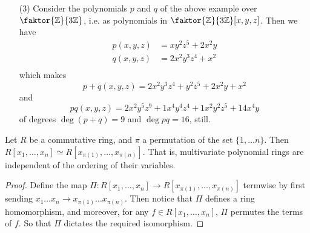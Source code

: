 \begin{example}
\begin{enumerate}
    \item[(3)] Consider the polynomials $p$ and $q$ of the above example
      over  $\faktor{\Z}{3\Z}$, i.e. as polynomials in
      $\faktor{\Z}{3\Z}[x,y,z]$. Then we have
      \begin{align*}
        p(x,y,z)    &=  xy^2z^5+2x^2y    \\
        q(x,y,z)    &=  2x^2y^3z^4+x^2  \\
      \end{align*}
      which makes
      \begin{equation*}
        p+q(x,y,z)=2x^2y^3z^4+y^2z^5+2x^2y+x^2
      \end{equation*}
      and
      \begin{equation*}
        pq(x,y,z)=2x^2y^5z^9+1x^4y^4z^4+1x^2y^2z^5+14x^4y
      \end{equation*}
      of degrees $\deg{(p+q)}=9$ and $\deg{pq}=16$, still.
  \end{enumerate}
\end{example}

\begin{lemma}\label{lemma_7.1.3}
  Let $R$ be a commutative ring, and  $\pi$ a permutation of the set  $\{1,
  \dots n\}$. Then $R[x_1, \dots, x_n] \simeq R[x_{\pi(1)}, \dots,
  x_{\pi(n)}]$. That is, multivariate polynomial rings are independent of the
  ordering of their variables.
\end{lemma}
\begin{proof}
  Define the map $\Pi:R[x_1, \dots, x_n] \xrightarrow{} R[x_{\pi(1)}, \dots,
  x_{\pi(n)}]$ termwise by first sending $x_1 \dots x_n \xrightarrow{}
  x_{\pi(1)} \dots x_{\pi(n)}$. Then notice that $\Pi$ defines a ring
  homomorphism, and moreover, for any  $f \in R[x_1, \dots, x_n]$, $\Pi$
  permutes the terms of $f$. So that  $\Pi$ dictates the required isomorphism.
\end{proof}

